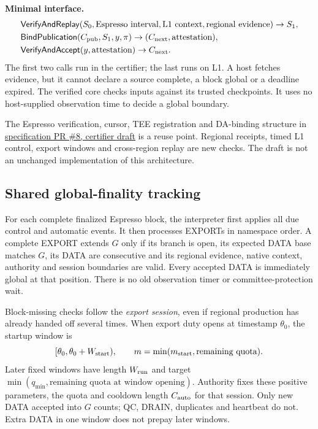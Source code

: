 \documentclass[11pt,a4paper]{article}
\newcommand{\api}[1]{\ensuremath{\mathsf{#1}}}
\newcommand{\iface}{\textbf{Minimal interface.}\ }
\begin{document}
\iface
\[
\begin{aligned}
 &\api{VerifyAndReplay}(S_0,\text{Espresso interval},
       \text{L1 context},\text{regional evidence})\to S_1,\\
 &\api{BindPublication}(C_{\rm pub},S_1,y,\pi)
       \to(C_{\rm next},\text{attestation}),\\
 &\api{VerifyAndAccept}(y,\text{attestation})\to C_{\rm next}.
\end{aligned}
\]
The first two calls run in the certifier; the last runs on L1.
A host fetches evidence, but it cannot declare a source complete,
a block global or a deadline expired. The verified core checks inputs
against its trusted checkpoints. It uses no host-supplied observation
time to decide a global boundary.

The Espresso verification, cursor, TEE registration and DA-binding
structure in
\href{https://github.com/megaeth-labs/specification/blob/aedc2826663b134ee25d26bea17e70c6d23d321c/specs/block-certification/certifier.md}{specification PR \#8, certifier draft}
is a reuse point. Regional receipts, timed L1 control, export windows and
cross-region replay are new checks. The draft is not an unchanged
implementation of this architecture.

\subsection{Shared global-finality tracking}\label{sec:tracker}
For each complete finalized Espresso block, the interpreter first applies
all due control and automatic events. It then processes EXPORTs in
namespace order. A complete EXPORT extends $G$ only if its branch is
open, its expected DATA base matches $G$, its DATA are consecutive and its
regional evidence, native context, authority and session boundaries
are valid. Every accepted DATA is immediately global at that position.
There is no old observation timer or committee-protection wait.

Block-missing checks follow the \emph{export session}, even if regional
production has already handed off several times. When export duty opens
at timestamp $\theta_0$, the startup window is
\[
 [\theta_0,\theta_0+W_{\rm start}),\qquad
 m=\min(m_{\rm start},\text{remaining quota}).
\]
Later fixed windows have length $W_{\rm run}$ and target
$\min(q_{\min},\text{remaining quota at window opening})$.
Authority fixes these positive parameters, the quota and cooldown length
$C_{\rm auto}$ for that session. Only new DATA accepted into $G$ counts;
QC, DRAIN, duplicates and heartbeat do not. Extra DATA in one window
does not prepay later windows.
\end{document}
